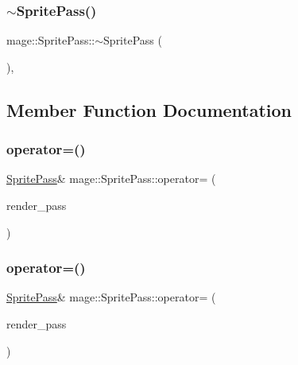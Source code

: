 \hypertarget{classmage_1_1_sprite_pass_a70a866324750c21196d80364e9a0e309}{}\label{classmage_1_1_sprite_pass_a70a866324750c21196d80364e9a0e309} 
\subsubsection{\texorpdfstring{$\sim$\+Sprite\+Pass()}{~SpritePass()}}
{\footnotesize\ttfamily mage\+::\+Sprite\+Pass\+::$\sim$\+Sprite\+Pass (\begin{DoxyParamCaption}{ }\end{DoxyParamCaption})\hspace{0.3cm}{\ttfamily [virtual]}, {\ttfamily [default]}}



\subsection{Member Function Documentation}
\hypertarget{classmage_1_1_sprite_pass_afa43bb0a8588e9196180aa686d81cacc}{}\label{classmage_1_1_sprite_pass_afa43bb0a8588e9196180aa686d81cacc} 
\subsubsection{\texorpdfstring{operator=()}{operator=()}\hspace{0.1cm}{\footnotesize\ttfamily [1/2]}}
{\footnotesize\ttfamily \hyperlink{classmage_1_1_sprite_pass}{Sprite\+Pass}\& mage\+::\+Sprite\+Pass\+::operator= (\begin{DoxyParamCaption}\item[{const \hyperlink{classmage_1_1_sprite_pass}{Sprite\+Pass} \&}]{render\+\_\+pass }\end{DoxyParamCaption})\hspace{0.3cm}{\ttfamily [delete]}}

\hypertarget{classmage_1_1_sprite_pass_aed8cc2bcb9ded1cb96c9d65bb7034c0a}{}\label{classmage_1_1_sprite_pass_aed8cc2bcb9ded1cb96c9d65bb7034c0a} 
\subsubsection{\texorpdfstring{operator=()}{operator=()}\hspace{0.1cm}{\footnotesize\ttfamily [2/2]}}
{\footnotesize\ttfamily \hyperlink{classmage_1_1_sprite_pass}{Sprite\+Pass}\& mage\+::\+Sprite\+Pass\+::operator= (\begin{DoxyParamCaption}\item[{\hyperlink{classmage_1_1_sprite_pass}{Sprite\+Pass} \&\&}]{render\+\_\+pass }\end{DoxyParamCaption})\hspace{0.3cm}{\ttfamily [delete]}}

